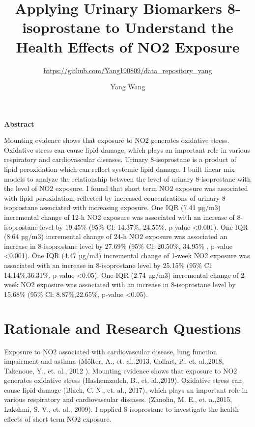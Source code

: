 \documentclass[12pt,]{article}
\title{Applying Urinary Biomarkers 8-isoprostane to Understand the Health
Effects of NO2 Exposure}
\subtitle{\url{https://github.com/Yang190809/data_repository_yang}}
\author{Yang Wang}
\date{}
\begin{document}
\maketitle

\textbf{Abstract}

Mounting evidence shows that exposure to NO2 generates oxidative stress.
Oxidative stress can cause lipid damage, which plays an important role
in various respiratory and cardiovascular diseases. Urinary
8-isoprostane is a product of lipid peroxidation which can reflect
systemic lipid damage. I built linear mix models to analyze the
relationship between the level of urinary 8-isoprostane with the level
of NO2 exposure. I found that short term NO2 exposure was associated
with lipid peroxidation, reflected by increased concentrations of
urinary 8-isoprostane associated with increasing exposure. One IQR (7.41
µg/m3) incremental change of 12-h NO2 exposure was associated with an
increase of 8-isoprostane level by 19.45\% (95\% Cl: 14.37\%, 24.55\%,
p-value \textless0.001). One IQR (8.64 µg/m3) incremental change of 24-h
NO2 exposure was associated an increase in 8-isoprostane level by
27.69\% (95\% Cl: 20.50\%, 34.95\% , p-value \textless0.001). One IQR
(4.47 µg/m3) incremental change of 1-week NO2 exposure was associated
with an increase in 8-isoprostane level by 25.15\% (95\% Cl:
14.14\%,36.31\%, p-value \textless0.05). One IQR (2.74 µg/m3)
incremental change of 2-week NO2 exposure was associated with an
increase in 8-isoprostane level by 15.68\% (95\% Cl: 8.87\%,22.65\%,
p-value \textless0.05).

\newpage
\tableofcontents 
\newpage
\listoftables 
\newpage
\listoffigures

\newpage

\hypertarget{rationale-and-research-questions}{%
\section{Rationale and Research
Questions}\label{rationale-and-research-questions}}

Exposure to NO2 associated with cardiovascular disease, lung function
impairment and asthma (Mölter, A., et. al.,2013, Collart, P., et.
al.,2018, Takenoue, Y., et. al., 2012 ). Mounting evidence shows that
exposure to NO2 generates oxidative stress (Hashemzadeh, B., et.
al.,2019). Oxidative stress can cause lipid damage (Black, C. N., et.
al., 2017), which plays an important role in various respiratory and
cardiovascular diseases. (Zanolin, M. E., et. a.,2015, Lakshmi, S. V.,
et. al., 2009). I applied 8-isoprostane to investigate the health
effects of short term NO2 exposure.
\end{document}
